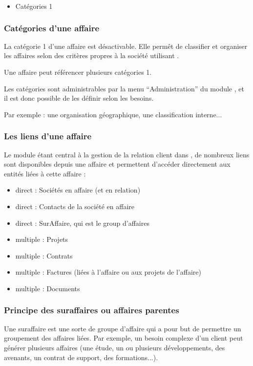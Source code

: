 \begin{itemize}
\item Catégories 1
\end{itemize}


\subsubsection{Catégories d'une affaire}
\label{deal_cat}

La catégorie 1 d'une affaire est désactivable. Elle permêt de classifier et organiser les affaires selon des critères propres à la société utilisant \obm.

Une affaire peut référencer plusieurs catégories 1.

Les catégories sont administrables par la menu ``Administration'' du module \deal, et il est donc possible de les définir selon les besoins.

Par exemple : une organisation géographique, une classification interne...


\subsubsection{Les liens d'une affaire}

Le module \deal étant central à la gestion de la relation client dans \obm, de nombreux liens sont disponibles depuis une affaire et permettent d'accéder directement aux entités liées à cette affaire :\\

\begin{itemize}
\item direct : Sociétés en affaire (et en relation)
\item direct : Contacts de la société en affaire
\item direct : SurAffaire, qui est le group d'affaires
\item multiple : Projets
\item multiple : Contrats
\item multiple : Factures (liées à l'affaire ou aux projets de l'affaire)
\item multiple : Documents
\end{itemize}


\subsubsection{Principe des suraffaires ou affaires parentes}

Une suraffaire est une sorte de groupe d'affaire qui a pour but de permettre un groupement des affaires liées.
Par exemple, un besoin complexe d'un client peut générer plusieurs affaires (une étude, un ou plusieurs développements, des avenants, un contrat de support, des formations...).

